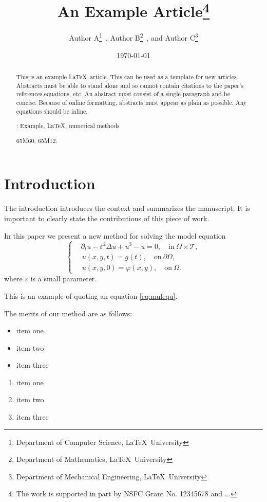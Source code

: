 \documentclass[10pt,reqno,final]{article}
\title{An Example Article\thanks{The work is supported in part by NSFC Grant No. 12345678 and ...}}
\author{
  Author A\thanks{Department of Computer Science, \LaTeX\ University}~,
  Author B\thanks{Department of Mathematics, \LaTeX\ University}~,
  and
  Author C\thanks{Department of Mechanical Engineering, \LaTeX\ University}
}
\date{\today}
\theoremstyle{plain}
\theoremstyle{definition}
\theoremstyle{remark}
\numberwithin{equation}{section}
\numberwithin{figure}{section}
\numberwithin{table}{section}
\begin{document}
\maketitle

\begin{abstract}
This is an example \LaTeX\ article. This can be used as a template for new articles.
Abstracts must be able to stand alone and so cannot contain citations to the paper's references,equations, etc.
An abstract must consist of a single paragraph and be concise.
Because of online formatting, abstracts must appear as plain as possible.
Any equations should be inline.

\medskip
{}: Example, \LaTeX, numerical methods

\medskip
{} 65M60, 65M12.
\end{abstract}


\section{Introduction}

The introduction introduces the context and summarizes the manuscript.
It is important to clearly state the contributions of this piece of work.

In this paper we present a new method for solving the model equation
\begin{equation}\label{eq:mulequ}
\left\{\begin{aligned}
  & \partial_{t} u-\varepsilon^{2} \Delta u+u^{3}-u=0, \quad \text{in} ~\Omega\times\mathcal{T}, \\
  &\, u(x,y,t) = g(t), \quad \text{on} ~ \partial \Omega, \\
  &\, u(x,y,0)=\varphi(x, y), \quad \text{on} ~\Omega.
\end{aligned}\right.
\end{equation}
where $\varepsilon$ is a small parameter.

This is an example of quoting an equation \eqref{eq:mulequ}.

The merits of our method are as follows:
\begin{itemize}
  \item item one
  \item item two
  \item item three
\end{itemize}
\begin{enumerate}
  \item item one
  \item item two
  \item item three
\end{enumerate}
\end{document}
